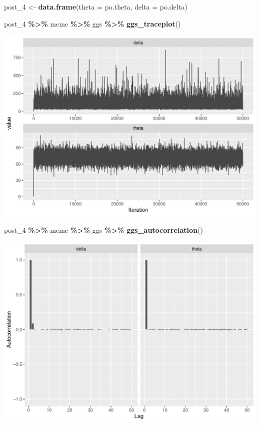 \documentclass[
]{article}
\newenvironment{Shaded}{\begin{snugshade}}{\end{snugshade}}
\newcommand{\AttributeTok}[1]{\textcolor[rgb]{0.13,0.29,0.53}{#1}}
\newcommand{\FunctionTok}[1]{\textcolor[rgb]{0.13,0.29,0.53}{\textbf{#1}}}
\newcommand{\NormalTok}[1]{#1}
\newcommand{\OtherTok}[1]{\textcolor[rgb]{0.56,0.35,0.01}{#1}}
\newcommand{\SpecialCharTok}[1]{\textcolor[rgb]{0.81,0.36,0.00}{\textbf{#1}}}
\begin{document}
\begin{Shaded}
\begin{Highlighting}[]
\NormalTok{post\_4 }\OtherTok{\textless{}{-}} \FunctionTok{data.frame}\NormalTok{(}\AttributeTok{theta =}\NormalTok{ po.theta, }\AttributeTok{delta =}\NormalTok{ po.delta)}
\end{Highlighting}
\end{Shaded}

\begin{Shaded}
\begin{Highlighting}[]
\NormalTok{post\_4 }\SpecialCharTok{\%\textgreater{}\%}\NormalTok{ mcmc }\SpecialCharTok{\%\textgreater{}\%}\NormalTok{ ggs }\SpecialCharTok{\%\textgreater{}\%} \FunctionTok{ggs\_traceplot}\NormalTok{()}
\end{Highlighting}
\end{Shaded}

\begin{center}\includegraphics[width=0.8\linewidth]{Bayes_stat_hw3_files/figure-latex/unnamed-chunk-48-1} \end{center}

\begin{Shaded}
\begin{Highlighting}[]
\NormalTok{post\_4 }\SpecialCharTok{\%\textgreater{}\%}\NormalTok{ mcmc }\SpecialCharTok{\%\textgreater{}\%}\NormalTok{ ggs }\SpecialCharTok{\%\textgreater{}\%} \FunctionTok{ggs\_autocorrelation}\NormalTok{()}
\end{Highlighting}
\end{Shaded}

\begin{center}\includegraphics[width=0.8\linewidth]{Bayes_stat_hw3_files/figure-latex/unnamed-chunk-48-2} \end{center}
\end{document}
